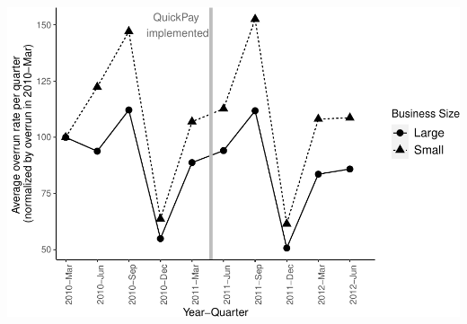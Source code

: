 \documentclass[
]{article}
\begin{document}
\includegraphics{qp_first_budget_overrun_files/figure-latex/normalized_pc_plot-1.pdf}
\end{document}
